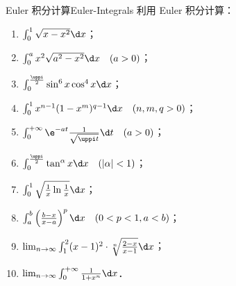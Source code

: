 \begin{problem}{Euler 积分计算}{Euler-Integrals}
    利用 Euler 积分计算：
    \begin{enumerate}
        \item $\int_{0}^{1} \sqrt{x-x^2} \d x$；
        \item $\int_{0}^{a} x^2\sqrt{a^2-x^2} \d x \quad (a > 0)$；
        \item $\int_{0}^{\frac{\uppi}{2}} \sin^6 x \cos^4 x \d x$；
        \item $\int_{0}^{1} x^{n-1}(1-x^m)^{q-1} \d x \quad (n, m, q > 0)$；
        \item $\int_{0}^{+\infty} \e^{-at} \frac{1}{\sqrt{\uppi t}} \d t \quad (a > 0)$；
        \item $\int_{0}^{\frac{\uppi}{2}} \tan^{\alpha} x \d x \quad (|\alpha| < 1)$；
        \item $\int_{0}^{1} \sqrt{\frac{1}{x} \ln \frac{1}{x}} \d x$；
        \item $\int_{a}^{b} \left(\frac{b-x}{x-a}\right)^p \d x \quad (0 < p < 1, a < b)$；
        \item $\lim_{n \to \infty} \int_{1}^{2} (x-1)^2 \cdot \sqrt[n]{\frac{2-x}{x-1}} \d x$；
        \item $\lim_{n \to \infty} \int_{0}^{+\infty} \frac{1}{1+x^n} \d x$．
    \end{enumerate}
\end{problem}

